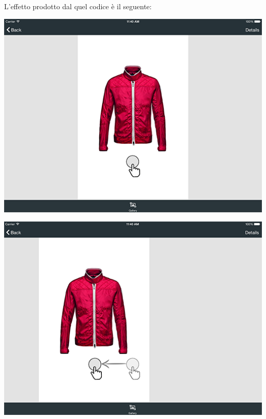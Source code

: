 L'effetto prodotto dal quel codice è il seguente:

\vspace{1em}
\noindent
\begin{minipage}{\textwidth}
  \begin{minipage}[b]{0.49\textwidth}
    \centering
    \includegraphics[scale=0.25]{../immagini/swipe-start}
	\end{minipage}
	  \hfill
  \begin{minipage}[b]{0.49\textwidth}
    \centering
  \includegraphics[scale=0.25]{../immagini/swipe-follow}
  \end{minipage}
\end{minipage}


